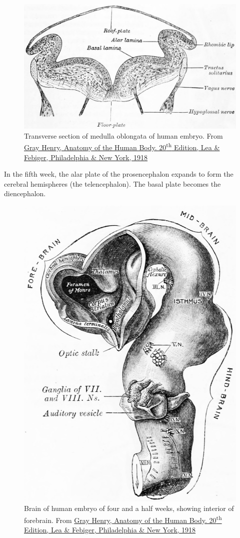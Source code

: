\begin{figure}

{\centering \includegraphics[width=0.7\linewidth]{./figures/development/GrayAnat1918p749} 

}

\caption{Transverse section of medulla oblongata of human embryo. From \href{https://archive.org/details/anatomyofhumanbo1918gray/page/n6/mode/2up}{Gray Henry, Anatomy of the Human Body. 20\textsuperscript{th} Edition, Lea \& Febiger, Philadelphia \& New York, 1918}}\label{fig:medullaoblongata}
\end{figure}

In the fifth week, the alar plate of the prosencephalon expands to form the cerebral hemispheres (the telencephalon). The basal plate becomes the diencephalon.



\begin{figure}

{\centering \includegraphics[width=0.7\linewidth]{./figures/development/GrayAnat1918p740} 

}

\caption{Brain of human embryo of four and a half weeks, showing interior of forebrain. From \href{https://archive.org/details/anatomyofhumanbo1918gray/page/n6/mode/2up}{Gray Henry, Anatomy of the Human Body. 20\textsuperscript{th} Edition, Lea \& Febiger, Philadelphia \& New York, 1918}}\label{fig:fourandahalf}
\end{figure}




